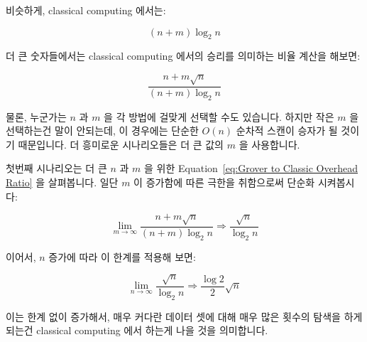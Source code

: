 비슷하게, classical computing 에서는:

\begin{equation}
	\left( n + m \right) \log_2 n
\end{equation}

더 큰 숫자들에서는 classical computing 에서의 승리를 의미하는 비율 계산을
해보면:

\begin{equation}
	\frac{n + m \sqrt n}{\left( n + m \right) \log_2 n}
\label{eq:Grover to Classic Overhead Ratio}
\end{equation}

물론, 누군가는 $n$ 과 $m$ 을 각 방법에 걸맞게 선택할 수도 있습니다.
하지만 작은 $m$ 을 선택하는건 말이 안되는데, 이 경우에는 단순한 $O(n)$ 순차적
스캔이 승자가 될 것이기 때문입니다.
더 흥미로운 시나리오들은 더 큰 값의 $m$ 을 사용합니다.

첫번째 시나리오는 더 큰 $n$ 과 $m$ 을 위한
Equation~\ref{eq:Grover to Classic Overhead Ratio}
을 살펴봅니다.
일단 $m$ 이 증가함에 따른 극한을 취함으로써 단순화 시켜봅시다:

\begin{equation}
	\lim_{m\to\infty} \frac{n + m \sqrt n}{\left( n + m \right) \log_2 n}
	\Rightarrow \frac{\sqrt n}{\log_2 n}
\label{eq:sqrt n by log 2 n}
\end{equation}

이어서, $n$ 증가에 따라 이 한계를 적용해 보면:

\begin{equation}
	\lim_{n\to\infty} \frac{\sqrt n}{\log_2 n}
	\Rightarrow \frac{\log 2}{2} \sqrt n
\end{equation}

이는 한계 없이 증가해서, 매우 커다란 데이터 셋에 대해 매우 많은 횟수의 탐색을
하게 되는건 classical computing 에서 하는게 나을 것을 의미합니다.

